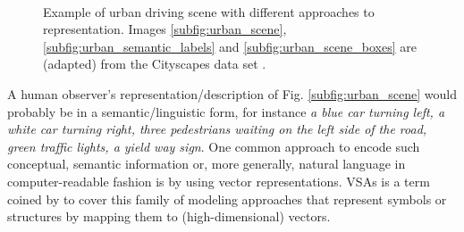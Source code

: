 \begin{figure}[t!]
	\centering
	\\
	\caption{Example of urban driving scene with different approaches to representation. Images \ref{subfig:urban_scene}, \ref{subfig:urban_semantic_labels} and \ref{subfig:urban_scene_boxes} are (adapted) from the Cityscapes data set \parencite{Cordts2016}.}
    \label{fig:urban_scene}
\end{figure}
A human observer's representation/description of Fig. \ref{subfig:urban_scene} would probably be in a semantic/linguistic form, for instance \emph{a blue car turning left, a white car turning right, three pedestrians waiting on the left side of the road, green traffic lights, a yield way sign}.
One common approach to encode such conceptual, semantic information or, more generally, natural language in computer-readable fashion is by using vector representations.
\acfp{VSA} is a term coined by \textcite{Gayler2003} to cover this family of modeling approaches that represent symbols or structures by mapping them to (high-dimensional) vectors.

